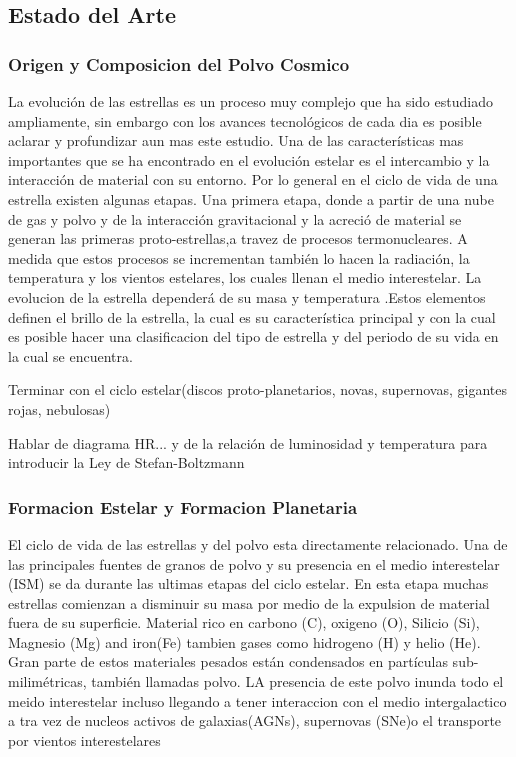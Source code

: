\documentclass[12pt]{article}
\begin{document}
\subsection{Estado del Arte}
\subsubsection{Origen y Composicion del Polvo Cosmico}
La evolución de las estrellas es un proceso muy complejo que ha sido estudiado ampliamente, sin embargo con los avances tecnológicos de cada dia es posible aclarar y profundizar aun mas este estudio. 
Una de las características mas importantes que se ha encontrado en el evolución estelar es el intercambio y la interacción de material con su entorno. Por lo general en el ciclo de vida de una estrella 
existen algunas etapas. Una primera etapa, donde a partir de una nube de gas y polvo  y de la interacción gravitacional y la acreció de material se generan las primeras proto-estrellas,a travez de procesos 
termonucleares. A medida que estos procesos se incrementan también lo hacen la radiación, la temperatura y  los vientos estelares, los cuales llenan el medio interestelar. La evolucion de la estrella 
dependerá de su masa y temperatura \cite{Whittet2022DustIT}.Estos elementos definen el brillo de la estrella, la cual es su característica principal y con la cual es posible hacer una clasificacion del tipo de estrella y del periodo 
de su vida en la cual se encuentra. 

Terminar con el ciclo estelar(discos proto-planetarios, novas, supernovas, gigantes rojas, nebulosas)

Hablar de diagrama HR... y de la relación de luminosidad y temperatura para introducir la Ley de Stefan-Boltzmann

\subsubsection{Formacion Estelar y Formacion Planetaria}
El ciclo de vida de las estrellas y del polvo esta directamente relacionado. Una de las principales fuentes de granos de polvo y su presencia en el medio interestelar (ISM) se da durante las ultimas etapas 
del ciclo estelar. En esta etapa muchas estrellas comienzan a disminuir su masa por medio de la expulsion de material fuera de su superficie. Material rico en carbono (C), oxigeno (O), Silicio (Si), Magnesio (Mg) 
and iron(Fe) tambien gases como hidrogeno (H) y helio (He). Gran parte de estos materiales pesados están condensados en partículas sub-milimétricas, también llamadas polvo. LA presencia de este polvo inunda todo 
el meido interestelar incluso llegando a tener interaccion con el medio intergalactico a tra vez de nucleos activos de galaxias(AGNs), supernovas (SNe)o el transporte por vientos  interestelares \cite{mathis1977size}
\end{document}
